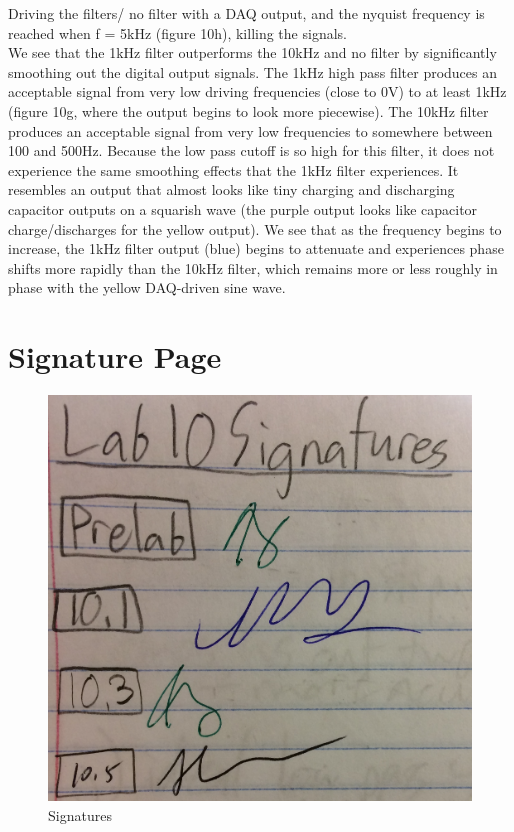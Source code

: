 \documentclass{article}
\begin{document}
    Driving the filters/ no filter with a DAQ output, and the nyquist frequency is reached when f = 5kHz (figure 10h), killing the signals. \\\indent 
    We see that the 1kHz filter outperforms the 10kHz and no filter by significantly smoothing out the digital output signals. The 1kHz high pass filter produces an acceptable signal from very low driving frequencies (close to 0V) to at least 1kHz (figure 10g, where the output begins to look more piecewise). The 10kHz filter produces an acceptable signal from very low frequencies to somewhere between 100 and 500Hz. Because the low pass cutoff is so high for this filter, it does not experience the same smoothing effects that the 1kHz filter experiences. It resembles an output that almost looks like tiny charging and discharging capacitor outputs on a squarish wave (the purple output looks like capacitor charge/discharges for the yellow output). We see that as the frequency begins to increase, the 1kHz filter output (blue) begins to attenuate and experiences phase shifts more rapidly than the 10kHz filter, which remains more or less roughly in phase with the yellow DAQ-driven sine wave.




\section{Signature Page}
\begin{figure}[H]
    \centering
    \includegraphics[scale = 0.15]{sig.JPG}
    \caption{Signatures}
    \label{fig:my_label}
\end{figure}



{}

\end{document}
